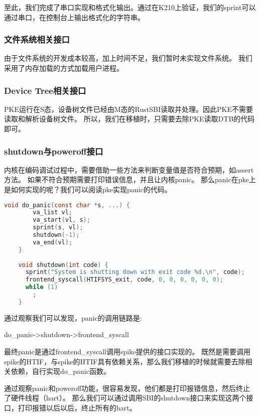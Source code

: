 至此，我们完成了串口实现和格式化输出。通过在K210上验证，我们的sprint可以通过串口，在控制台上输出格式化的字符串。

\subsubsection{文件系统相关接口}

由于文件系统的开发成本较高，加上时间不足，我们暂时未实现文件系统。
我们采用了内存加载的方式加载用户进程。

\subsubsection{Device Tree相关接口}

PKE运行在S态，设备树文件已经由M态的RustSBI读取并处理。因此PKE不需要读取和解析设备树文件。
所以，我们在移植时，只需要去除PKE读取DTB的代码即可。

\subsubsection{shutdown与poweroff接口}

内核在编码调试过程中，需要借助一些方法来判断变量值是否符合预期，如assert方法。
如果不符合预期需要打印错误信息，并且让内核panic。
那么panic在pke上是如何实现的呢？我们可以阅读pke实现panic的代码。

\begin{lstlisting}[language=C, caption={panic实现代码}, label={lst:panic} ]
    void do_panic(const char *s, ...) {
        va_list vl;
        va_start(vl, s);
        sprint(s, vl);
        shutdown(-1);
        va_end(vl);
    }
    
    void shutdown(int code) {
      sprint("System is shutting down with exit code %d.\n", code);
      frontend_syscall(HTIFSYS_exit, code, 0, 0, 0, 0, 0, 0);
      while (1)
        ;
    }    
\end{lstlisting}

通过观察我们可以发现，panic的调用链路是:

do\_panic->shutdown->frontend\_syscall

最终panic是通过frontend\_syscall调用spike提供的接口实现的。
既然是需要调用spike的HTIF，与spike的HTIF具有依赖关系，那么我们移植的时候就需要去除相关依赖，自行实现do\_panic函数。

通过观察panic和poweroff功能，很容易发现，他们都是打印报错信息，然后终止了硬件线程（hart）。
那么我们可以通过调用SBI的shutdown接口来实现这两个接口，打印报错以后以后，终止所有的hart。

